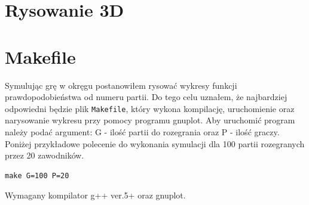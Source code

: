 
\section{Rysowanie 3D}
\label{sec::3d}


\section{Makefile}
\label{sec::makefile}
Symulując grę w okręgu postanowiłem rysować wykresy funkcji prawdopodobieństwa od numeru partii. Do tego celu uznałem, że najbardziej odpowiedni będzie plik \texttt{Makefile}, który wykona kompilację, uruchomienie oraz narysowanie wykresu przy pomocy programu gnuplot. Aby uruchomić program należy podać argument: G - ilość partii do rozegrania oraz P - ilość graczy. Poniżej przykładowe polecenie do wykonania symulacji dla 100 partii rozegranych przez 20 zawodników.
\begin{verbatim}
make G=100 P=20
\end{verbatim}
Wymagany kompilator g++ ver.5+ oraz gnuplot. 
